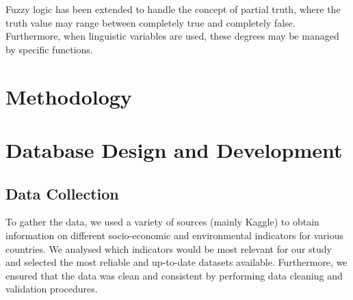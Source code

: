 \documentclass[fleqn,11pt]{article}
\begin{document}
Fuzzy logic has been extended to handle the concept of partial truth, where the truth value may range between completely true and completely false. Furthermore, when linguistic variables are used, these degrees may be managed by specific functions.

\section{Methodology}



\section{Database Design and Development}


\subsection{Data Collection}
To gather the data, we used a variety of sources (mainly Kaggle) to obtain information on different socio-economic and environmental indicators for various countries.
We analysed which indicators would be most relevant for our study and selected the most reliable and up-to-date datasets available.
Furthermore, we ensured that the data was clean and consistent by performing data cleaning and validation procedures.
\end{document}
